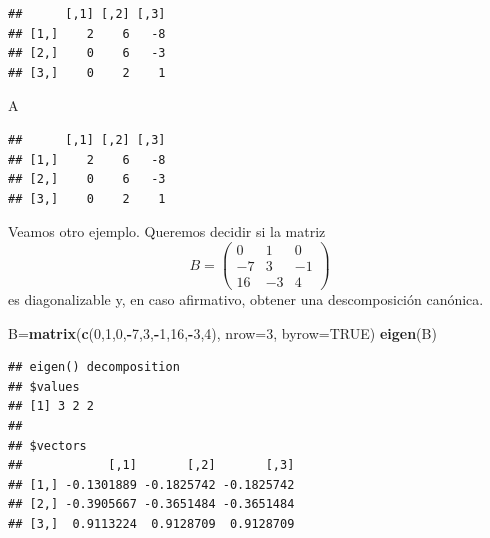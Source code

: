 \documentclass[]{book}
\newenvironment{Shaded}{\begin{snugshade}}{\end{snugshade}}
\newcommand{\DataTypeTok}[1]{\textcolor[rgb]{0.13,0.29,0.53}{#1}}
\newcommand{\DecValTok}[1]{\textcolor[rgb]{0.00,0.00,0.81}{#1}}
\newcommand{\KeywordTok}[1]{\textcolor[rgb]{0.13,0.29,0.53}{\textbf{#1}}}
\newcommand{\NormalTok}[1]{#1}
\newcommand{\OperatorTok}[1]{\textcolor[rgb]{0.81,0.36,0.00}{\textbf{#1}}}
\newcommand{\OtherTok}[1]{\textcolor[rgb]{0.56,0.35,0.01}{#1}}
\theoremstyle{definition}
\theoremstyle{definition}
\theoremstyle{definition}
\theoremstyle{remark}
\begin{document}
\begin{Shaded}
\end{Shaded}

\begin{verbatim}
##      [,1] [,2] [,3]
## [1,]    2    6   -8
## [2,]    0    6   -3
## [3,]    0    2    1
\end{verbatim}

\begin{Shaded}
\begin{Highlighting}[]
\NormalTok{A}
\end{Highlighting}
\end{Shaded}

\begin{verbatim}
##      [,1] [,2] [,3]
## [1,]    2    6   -8
## [2,]    0    6   -3
## [3,]    0    2    1
\end{verbatim}

Veamos otro ejemplo. Queremos decidir si la matriz
\[
B=\left(\begin{array}{ccc}0 & 1 & 0 \\ -7 & 3 & -1 \\ 16 & -3 & 4\end{array}
\right)
\]
es diagonalizable y, en caso afirmativo, obtener una descomposición canónica.

\begin{Shaded}
\begin{Highlighting}[]
\NormalTok{B=}\KeywordTok{matrix}\NormalTok{(}\KeywordTok{c}\NormalTok{(}\DecValTok{0}\NormalTok{,}\DecValTok{1}\NormalTok{,}\DecValTok{0}\NormalTok{,}\OperatorTok{-}\DecValTok{7}\NormalTok{,}\DecValTok{3}\NormalTok{,}\OperatorTok{-}\DecValTok{1}\NormalTok{,}\DecValTok{16}\NormalTok{,}\OperatorTok{-}\DecValTok{3}\NormalTok{,}\DecValTok{4}\NormalTok{), }\DataTypeTok{nrow=}\DecValTok{3}\NormalTok{, }\DataTypeTok{byrow=}\OtherTok{TRUE}\NormalTok{)}
\KeywordTok{eigen}\NormalTok{(B)}
\end{Highlighting}
\end{Shaded}

\begin{verbatim}
## eigen() decomposition
## $values
## [1] 3 2 2
## 
## $vectors
##            [,1]       [,2]       [,3]
## [1,] -0.1301889 -0.1825742 -0.1825742
## [2,] -0.3905667 -0.3651484 -0.3651484
## [3,]  0.9113224  0.9128709  0.9128709
\end{verbatim}
\end{document}
